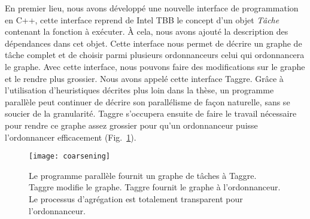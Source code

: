 En premier lieu, nous avons développé une nouvelle interface de programmation en C++, cette interface reprend de Intel TBB le concept d'un objet {\em Tâche} contenant la fonction à exécuter.
%
\`A cela, nous avons ajouté la description des dépendances dans cet objet.
%
Cette interface nous permet de décrire un graphe de tâche complet et de choisir parmi plusieurs ordonnanceurs celui qui ordonnancera le graphe.
%
Avec cette interface, nous pouvons faire des modifications sur le graphe et le rendre plus grossier.
%
Nous avons appelé cette interface Taggre.
%
Grâce à l'utilisation d'heuristiques décrites plus loin dans la thèse, un programme parallèle peut continuer de décrire son parallélisme de façon naturelle, sans se soucier de la granularité.
%
Taggre s'occupera ensuite de faire le travail nécessaire pour rendre ce graphe assez grossier pour qu'un ordonnanceur puisse l'ordonnancer efficacement (Fig.~\ref{fig:coarsening}).

\begin{figure}
  \centering
  \texttt{[image: coarsening]}
  \caption{Le programme parallèle fournit un graphe de tâches à Taggre. Taggre modifie le graphe. Taggre fournit le graphe à l'ordonnanceur. Le processus d'agrégation est totalement transparent pour l'ordonnanceur.}
  \label{fig:coarsening}
\end{figure}



